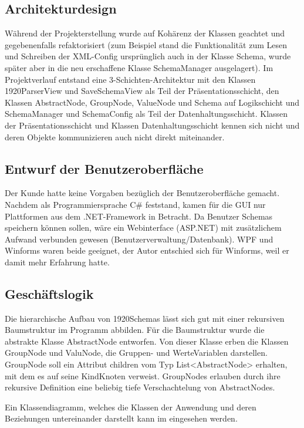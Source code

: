 \subsection{Architekturdesign}
\label{sec:Architekturdesign}
Während der Projekterstellung wurde auf Kohärenz der Klassen geachtet und gegebenenfalls refaktorisiert (zum Beispiel stand die Funktionalität zum Lesen und Schreiben der XML-Config ursprünglich auch in der Klasse Schema, wurde später aber in die neu erschaffene Klasse SchemaManager ausgelagert). Im Projektverlauf entstand eine 3-Schichten-Architektur mit den Klassen 1920ParserView und SaveSchemaView als Teil der Präsentationsschicht, den Klassen AbstractNode, GroupNode, ValueNode und Schema auf Logikschicht und SchemaManager und SchemaConfig als Teil der Datenhaltungsschicht. Klassen der Präsentationsschicht und Klassen Datenhaltungsschicht kennen sich nicht und deren Objekte kommunizieren auch nicht direkt miteinander.

\subsection{Entwurf der Benutzeroberfläche}
\label{sec:Benutzeroberflaeche}
Der Kunde hatte keine Vorgaben bezüglich der Benutzeroberfläche gemacht. 
Nachdem als Programmiersprache C\# feststand, kamen für die \ac{GUI} nur  Plattformen aus dem .NET-Framework in Betracht. Da Benutzer Schemas speichern können sollen, wäre ein Webinterface (ASP.NET) mit zusätzlichem Aufwand verbunden gewesen (Benutzerverwaltung/Datenbank). \ac{WPF} und Winforms waren beide geeignet, der Autor entschied sich für Winforms, weil er damit mehr Erfahrung hatte.

\subsection{Geschäftslogik}
\label{sec:Geschaeftslogik}
Die hierarchische Aufbau von 1920Schemas lässt sich gut mit einer rekursiven Baumstruktur im Programm abbilden. 
Für die Baumstruktur wurde die abstrakte Klasse AbstractNode entworfen. Von dieser Klasse erben die Klassen GroupNode und ValuNode, die Gruppen- und WerteVariablen darstellen. GroupNode soll ein Attribut children vom Typ List<AbstractNode> erhalten, mit dem es auf seine KindKnoten verweist. GroupNodes erlauben durch ihre rekursive Definition eine beliebig tiefe Verschachtelung von AbstractNodes.

Ein Klassendiagramm, welches die Klassen der Anwendung und deren Beziehungen untereinander darstellt kann im  eingesehen werden.


